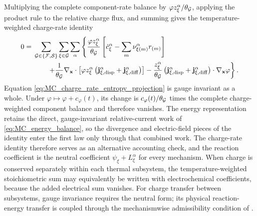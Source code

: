 Multiplying the complete component-rate balance by
\(\varphi z_\xi^\alpha/\theta_{\mathcal{G}}\), applying the product rule to the
relative charge flux, and summing gives the temperature-weighted charge-rate
identity
%
\begin{align}
	0
	={} &
	\sum_{\mathcal{G}\in\{\mathcal{F},\mathcal{S}\}}
	\sum_{\xi\in\mathcal{G}}\sum_\alpha
	\left\{
		\frac{\varphi z_\xi^\alpha}{\theta_{\mathcal{G}}}
		\left[
		\dot{c}_\xi^\alpha
		-
		\sum_m\nu_{\xi (m)}^\alpha r_{(m)}
		\right]
		\right.
	\notag \\
	& \left.
		\qquad
		+
		\frac{1}{\theta_{\mathcal{G}}}
		\nabla_{\mathbf{x}}\cdot
		\left[
			\varphi z_\xi^\alpha
			\left(
			\mathbf{j}_{\xi,{\rm disp}}^\alpha
			+
			\mathbf{j}_{\xi,{\rm diff}}^\alpha
			\right)
		\right]
		-
		\frac{z_\xi^\alpha}{\theta_{\mathcal{G}}}
		\left(
			\mathbf{j}_{\xi,{\rm disp}}^\alpha
			+
			\mathbf{j}_{\xi,{\rm diff}}^\alpha
		\right)\cdot
		\nabla_{\mathbf{x}}\varphi
	\right\}.
	\label{eq:MC_charge_rate_entropy_projection}
\end{align}
%
Equation \eqref{eq:MC_charge_rate_entropy_projection} is gauge invariant as a
whole.  Under \(\varphi\mapsto\varphi+c_\varphi(t)\), its change is
\(c_\varphi(t)/\theta_{\mathcal{G}}\) times the complete charge-weighted component
balance and therefore vanishes.  The energy representation retains the direct,
gauge-invariant relative-current work of \eqref{eq:MC_energy_balance}, so the
divergence and electric-field pieces of the identity enter the first law only
through that combined work.  The charge-rate identity therefore serves as an
alternative accounting check, and the reaction coefficient is the neutral
coefficient \(\psi_\xi+L_\xi^\alpha\) for every mechanism.  When charge is
conserved separately within each thermal subsystem, the temperature-weighted
stoichiometric sum may equivalently be written with electrochemical
coefficients, because the added electrical sum vanishes.  For charge transfer
between subsystems, gauge invariance requires the neutral form; its physical
reaction-energy transfer is coupled through the mechanismwise admissibility
condition of .

